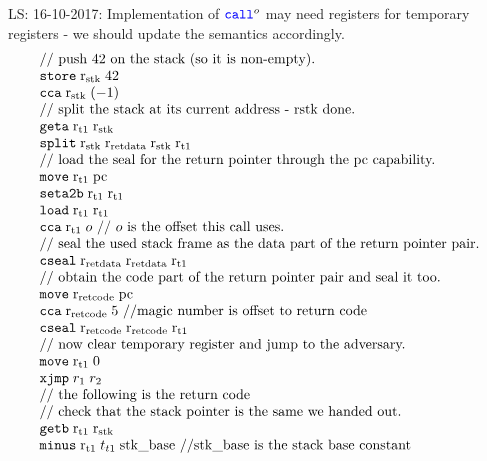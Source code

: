 \documentclass[a3paper]{article}
\newcommand\lau[1]{{\color{purple} \sf \footnotesize {LS: #1}}\\}
\newcommand{\sourcecolor}{\color{blue}}
\newcommand{\src}[1]{{\sourcecolor #1}}
\newcommand{\targetcolor}[1]{\color{black}}
\newcommand{\trg}[1]{{\targetcolor{} #1}}
\newcommand{\zinstr}[1]{\texttt{#1}}
\newcommand{\twoinstr}[3]{
  \ifthenelse{\equal{#2#3}{}}
  {\zinstr{#1}}
  {\zinstr{#1} \; #2 \; #3}
}
\newcommand{\threeinstr}[4]{
  \ifthenelse{\equal{#2#3#4}{}}
  {\zinstr{#1}}
  {\zinstr{#1} \; #2 \; #3 \; #4}
}
\newcommand{\fourinstr}[5]{
  \ifthenelse{\equal{#2#3#4#5}{}}
  {\zinstr{#1}}
  {\zinstr{#1} \; #2 \; #3 \; #4 \; #5}
}
\newcommand{\scall}[4][]{  
\ifthenelse{\equal{#3#4}{}}
  {\ensuremath{\zinstr{\src{call}}_{#1}^{#2}}}
  {\ensuremath{\zinstr{\src{call}}_{#1}^{#2} \; #3 \; #4}}
}
\newcommand{\tgeta}[2]{\twoinstr{\trg{geta}}{#1}{#2}}
\newcommand{\tgetb}[2]{\twoinstr{\trg{getb}}{#1}{#2}}
\newcommand{\tmove}[2]{\twoinstr{\trg{move}}{#1}{#2}}
\newcommand{\tstore}[2]{\twoinstr{\trg{store}}{#1}{#2}}
\newcommand{\tload}[2]{\twoinstr{\trg{load}}{#1}{#2}}
\newcommand{\tcca}[2]{\twoinstr{\trg{cca}}{#1}{#2}}
\newcommand{\txjmp}[2]{\twoinstr{\trg{xjmp}}{#1}{#2}}
\newcommand{\tsetatob}[2]{\twoinstr{\trg{seta2b}}{#1}{#2}}
\newcommand{\tminus}[3]{\threeinstr{\trg{minus}}{#1}{#2}{#3}}
\newcommand{\tcseal}[3]{\threeinstr{\trg{cseal}}{#1}{#2}{#3}}
\newcommand{\tsplit}[4]{\fourinstr{\trg{split}}{#1}{#2}{#3}{#4}}
\newcommand{\update}[2]{[#1 \mapsto #2]}
\newcommand{\var}[1]{\mathit{#1}}
\newcommand{\mem}{\var{mem}}
\newcommand{\constant}[1]{\mathrm{#1}}
\newcommand{\calllen}{\constant{call\_len}}
\newcommand{\stkb}{\constant{stk\_base}}
\newcommand{\pcreg}{\mathrm{pc}}
\newcommand{\rstk}{\mathrm{r}_\mathrm{stk}}
\newcommand{\rretc}{\mathrm{r}_\mathrm{ret code}}
\newcommand{\rretd}{\mathrm{r}_\mathrm{ret data}}
\newcommand{\rtmp}[1]{\mathrm{r}_\mathrm{t#1}}
\begin{document}
\lau{16-10-2017: Implementation of $\scall{o}{}{}$ may need registers for temporary registers - we should update the semantics accordingly.}
\[
  \begin{array}{l}
    \text{// push 42 on the stack (so it is non-empty).}\\
    \tstore{\rstk}{42}\\
    \tcca{\rstk}{(-1)}\\
    \text{// split the stack at its current address - rstk done.}\\
    \tgeta{\rtmp{1}}{\rstk}\\
    \tsplit{\rstk}{\rretd}{\rstk}{\rtmp{1}}\\
    \text{// load the seal for the return pointer through the pc capability.}\\
    \tmove{\rtmp{1}}{\pcreg}\\
    \tsetatob{\rtmp{1}}{\rtmp{1}}\\
    \tload{\rtmp{1}}{\rtmp{1}}\\
    \tcca{\rtmp{1}}{o}\text{ // $o$ is the offset this call uses.}\\
    \text{// seal the used stack frame as the data part of the return pointer pair.}\\
    \tcseal{\rretd}{\rretd}{\rtmp{1}}\\
    \text{// obtain the code part of the return pointer pair and seal it too.}\\
    \tmove{\rretc}{\pcreg}\\
    \tcca{\rretc}{5} \text{ //magic number is offset to return code}\\
    \tcseal{\rretc}{\rretc}{\rtmp{1}}\\
    \text{// now clear temporary register and jump to the adversary.}\\
    \tmove{\rtmp{1}}{0}\\
    \txjmp{r_1}{r_2}\\
    \text{// the following is the return code}\\
    \text{// check that the stack pointer is the same we handed out.}\\
    \tgetb{\rtmp{1}}{\rstk}\\
    \tminus{\rtmp{1}}{t_{t1}}{\stkb} \text{ //$\stkb$ is the stack base constant} \\

\end{array}\]
\end{document}
